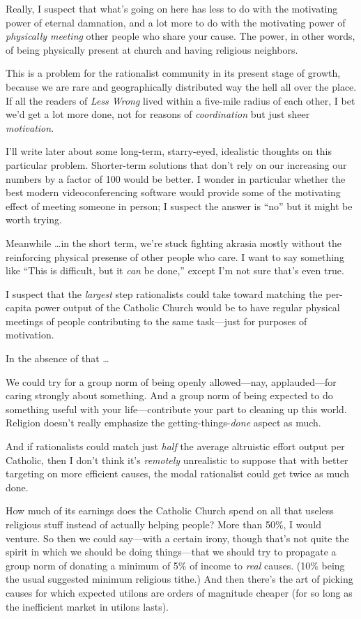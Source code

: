 {
 Really, I suspect that what's going on here has
less to do with the motivating power of eternal damnation, and a lot
more to do with the motivating power of \textit{physically meeting}
other people who share your cause. The power, in other words, of being
physically present at church and having religious neighbors.}

{
 This is a problem for the rationalist community in its present
stage of growth, because we are rare and geographically distributed way
the hell all over the place. If all the readers of \textit{Less Wrong}
lived within a five-mile radius of each other, I bet
we'd get a lot more done, not for reasons of
\textit{coordination} but just sheer \textit{motivation}.}

{
 I'll write later about some long-term,
starry-eyed, idealistic thoughts on this particular problem.
Shorter-term solutions that don't rely on our
increasing our numbers by a factor of 100 would be better. I wonder in
particular whether the best modern videoconferencing software would
provide some of the motivating effect of meeting someone in person; I
suspect the answer is ``no'' but it
might be worth trying.}

{
 Meanwhile \ldots in the short term, we're stuck
fighting akrasia mostly without the reinforcing physical presense of
other people who care. I want to say something like
``This is difficult, but it \textit{can} be
done,'' except I'm not sure
that's even true.}

{
 I suspect that the \textit{largest} step rationalists could take
toward matching the per-capita power output of the Catholic Church
would be to have regular physical meetings of people contributing to
the same task---just for purposes of motivation.}

{
 In the absence of that \ldots}

{
 We could try for a group norm of being openly allowed---nay,
applauded---for caring strongly about something. And a group norm of
being expected to do something useful with your life---contribute your
part to cleaning up this world. Religion doesn't really
emphasize the getting-things-\textit{done} aspect as much.}

{
 And if rationalists could match just \textit{half} the average
altruistic effort output per Catholic, then I don't
think it's \textit{remotely} unrealistic to suppose
that with better targeting on more efficient causes, the modal
rationalist could get twice as much done.}

{
 How much of its earnings does the Catholic Church spend on all
that useless religious stuff instead of actually helping people? More
than 50\%, I would venture. So then we could say---with a certain
irony, though that's not quite the spirit in which we
should be doing things---that we should try to propagate a group norm
of donating a minimum of 5\% of income to \textit{real} causes. (10\%
being the usual suggested minimum religious tithe.) And then
there's the art of picking causes for which expected
utilons are orders of magnitude cheaper (for so long as the inefficient
market in utilons lasts).}

